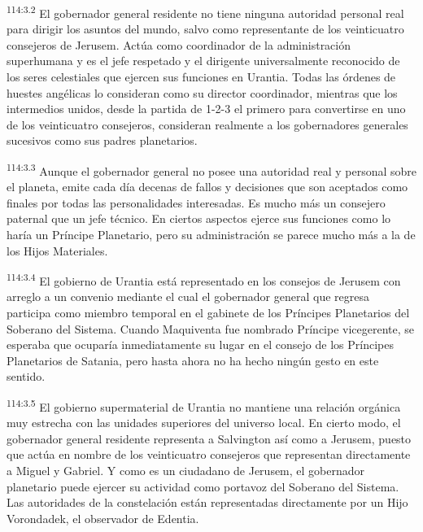 \documentclass[twoside, 11pt]{book}
\begin{document}
\par
\textsuperscript{114:3.2} El gobernador general residente no tiene ninguna autoridad personal real para dirigir los asuntos del mundo, salvo como representante de los veinticuatro consejeros de Jerusem. Actúa como coordinador de la administración superhumana y es el jefe respetado y el dirigente universalmente reconocido de los seres celestiales que ejercen sus funciones en Urantia. Todas las órdenes de huestes angélicas lo consideran como su director coordinador, mientras que los intermedios unidos, desde la partida de 1-2-3 el primero para convertirse en uno de los veinticuatro consejeros, consideran realmente a los gobernadores generales sucesivos como sus padres planetarios.

\par
\textsuperscript{114:3.3} Aunque el gobernador general no posee una autoridad real y personal sobre el planeta, emite cada día decenas de fallos y decisiones que son aceptados como finales por todas las personalidades interesadas. Es mucho más un consejero paternal que un jefe técnico. En ciertos aspectos ejerce sus funciones como lo haría un Príncipe Planetario, pero su administración se parece mucho más a la de los Hijos Materiales.

\par
\textsuperscript{114:3.4} El gobierno de Urantia está representado en los consejos de Jerusem con arreglo a un convenio mediante el cual el gobernador general que regresa participa como miembro temporal en el gabinete de los Príncipes Planetarios del Soberano del Sistema. Cuando Maquiventa fue nombrado Príncipe vicegerente, se esperaba que ocuparía inmediatamente su lugar en el consejo de los Príncipes Planetarios de Satania, pero hasta ahora no ha hecho ningún gesto en este sentido.

\par
\textsuperscript{114:3.5} El gobierno supermaterial de Urantia no mantiene una relación orgánica muy estrecha con las unidades superiores del universo local. En cierto modo, el gobernador general residente representa a Salvington así como a Jerusem, puesto que actúa en nombre de los veinticuatro consejeros que representan directamente a Miguel y Gabriel. Y como es un ciudadano de Jerusem, el gobernador planetario puede ejercer su actividad como portavoz del Soberano del Sistema. Las autoridades de la constelación están representadas directamente por un Hijo Vorondadek, el observador de Edentia.
\end{document}
